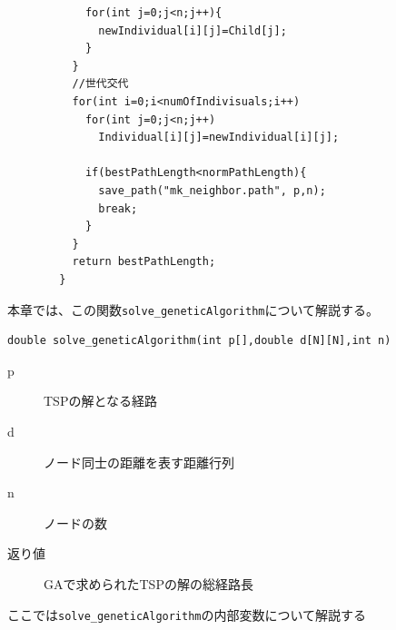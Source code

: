 \documentclass[9pt]{ltjsarticle}
\begin{document}
\begin{center}
\begin{verbatim}
            for(int j=0;j<n;j++){
              newIndividual[i][j]=Child[j];
            }
          }
          //世代交代
          for(int i=0;i<numOfIndivisuals;i++)
            for(int j=0;j<n;j++)
              Individual[i][j]=newIndividual[i][j]; 
        
            if(bestPathLength<normPathLength){
              save_path("mk_neighbor.path", p,n);
              break;
            }
          }
          return bestPathLength;
        }
    \end{verbatim}
\end{center}

本章では、この関数\verb|solve_geneticAlgorithm|について解説する。

\begin{tcolorbox}[title=GeneticAlgorithmソルバ]
\begin{verbatim}
double solve_geneticAlgorithm(int p[],double d[N][N],int n)
\end{verbatim}
\begin{description}
    \item[p]TSPの解となる経路
    \item[d]ノード同士の距離を表す距離行列
    \item[n]ノードの数
    \item[返り値]GAで求められたTSPの解の総経路長
\end{description}

\hrulefill

ここでは\verb|solve_geneticAlgorithm|の内部変数について解説する


\end{tcolorbox}
\end{document}
